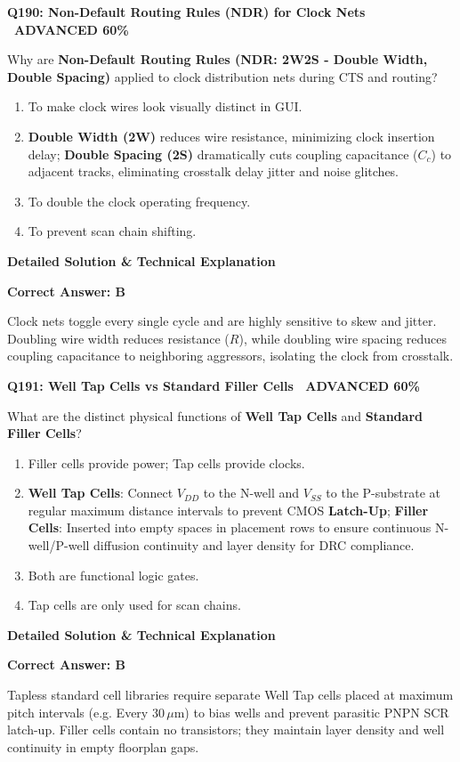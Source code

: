 \documentclass[11pt,a4paper]{article}
\newcommand{\badgeadv}{{\color{white}\colorbox{advred}{\bfseries\sffamily\tiny\ ADVANCED 60\%\ }}}
\newenvironment{qbox}[2]{%
  \begin{mdframed}[style=qstyle]%
  {\bfseries\sffamily\color{primaryblue}#1 \hfill #2}\par\vspace{2pt}%
}{%
  \end{mdframed}%
}
\newenvironment{ansbox}{%
  \begin{mdframed}[style=ansstyle]%
  {\bfseries\sffamily\color{ansgreen}\small Detailed Solution \& Technical Explanation}\par\vspace{2pt}\small%
}{%
  \end{mdframed}%
}
\begin{document}
\begin{qbox}{Q190: Non-Default Routing Rules (NDR) for Clock Nets}{\badgeadv}
Why are \textbf{Non-Default Routing Rules (NDR: 2W2S - Double Width, Double Spacing)} applied to clock distribution nets during CTS and routing?
\begin{enumerate}[label=\textbf{\Alph*.}]
  \item To make clock wires look visually distinct in GUI.
  \item \textbf{Double Width (2W)} reduces wire resistance, minimizing clock insertion delay; \textbf{Double Spacing (2S)} dramatically cuts coupling capacitance ($C_c$) to adjacent tracks, eliminating crosstalk delay jitter and noise glitches.
  \item To double the clock operating frequency.
  \item To prevent scan chain shifting.
\end{enumerate}
\end{qbox}
\begin{ansbox}
\textbf{Correct Answer: B}

Clock nets toggle every single cycle and are highly sensitive to skew and jitter. Doubling wire width reduces resistance ($R$), while doubling wire spacing reduces coupling capacitance to neighboring aggressors, isolating the clock from crosstalk.
\end{ansbox}

\begin{qbox}{Q191: Well Tap Cells vs Standard Filler Cells}{\badgeadv}
What are the distinct physical functions of \textbf{Well Tap Cells} and \textbf{Standard Filler Cells}?
\begin{enumerate}[label=\textbf{\Alph*.}]
  \item Filler cells provide power; Tap cells provide clocks.
  \item \textbf{Well Tap Cells}: Connect $V_{DD}$ to the N-well and $V_{SS}$ to the P-substrate at regular maximum distance intervals to prevent CMOS \textbf{Latch-Up}; \textbf{Filler Cells}: Inserted into empty spaces in placement rows to ensure continuous N-well/P-well diffusion continuity and layer density for DRC compliance.
  \item Both are functional logic gates.
  \item Tap cells are only used for scan chains.
\end{enumerate}
\end{qbox}
\begin{ansbox}
\textbf{Correct Answer: B}

Tapless standard cell libraries require separate Well Tap cells placed at maximum pitch intervals (e.g. Every $30\,\mu\text{m}$) to bias wells and prevent parasitic PNPN SCR latch-up. Filler cells contain no transistors; they maintain layer density and well continuity in empty floorplan gaps.
\end{ansbox}
\end{document}
